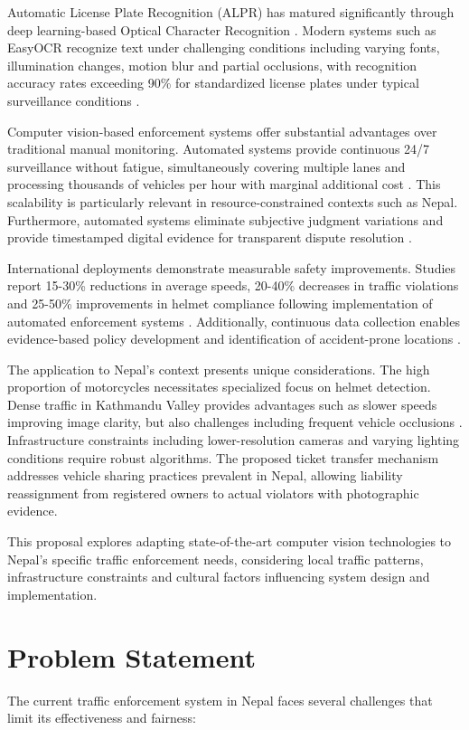 \documentclass[12pt, a4paper, oneside]{memoir}
\begin{document}
Automatic License Plate Recognition (ALPR) has matured significantly through deep learning-based Optical Character Recognition \cite{np_alpr2023}. Modern systems such as EasyOCR recognize text under challenging conditions including varying fonts, illumination changes, motion blur and partial occlusions, with recognition accuracy rates exceeding 90\% for standardized license plates under typical surveillance conditions \cite{patil2024traffic}.

Computer vision-based enforcement systems offer substantial advantages over traditional manual monitoring. Automated systems provide continuous 24/7 surveillance without fatigue, simultaneously covering multiple lanes and processing thousands of vehicles per hour with marginal additional cost \cite{ijarcce2026}. This scalability is particularly relevant in resource-constrained contexts such as Nepal. Furthermore, automated systems eliminate subjective judgment variations and provide timestamped digital evidence for transparent dispute resolution \cite{nepalpolice2025}.

International deployments demonstrate measurable safety improvements. Studies report 15-30\% reductions in average speeds, 20-40\% decreases in traffic violations and 25-50\% improvements in helmet compliance following implementation of automated enforcement systems \cite{bigwood2025review}. Additionally, continuous data collection enables evidence-based policy development and identification of accident-prone locations \cite{ioegc2015}.

The application to Nepal's context presents unique considerations. The high proportion of motorcycles necessitates specialized focus on helmet detection. Dense traffic in Kathmandu Valley provides advantages such as slower speeds improving image clarity, but also challenges including frequent vehicle occlusions \cite{acharya2015}. Infrastructure constraints including lower-resolution cameras and varying lighting conditions require robust algorithms. The proposed ticket transfer mechanism addresses vehicle sharing practices prevalent in Nepal, allowing liability reassignment from registered owners to actual violators with photographic evidence.

This proposal explores adapting state-of-the-art computer vision technologies to Nepal's specific traffic enforcement needs, considering local traffic patterns, infrastructure constraints and cultural factors influencing system design and implementation.

\section{Problem Statement}
The current traffic enforcement system in Nepal faces several challenges that limit its effectiveness and fairness:
\end{document}
